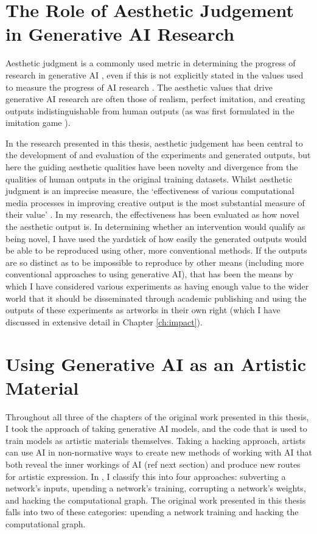 \section{The Role of Aesthetic Judgement in Generative AI Research}
\label{c8:sec:aesthetic}

Aesthetic judgment is a commonly used metric in determining the progress of research in generative AI \citep{larsen2016autoencoding}, even if this is not explicitly stated in the values used to measure the progress of AI research \citep{birhane2022values}.
The aesthetic values that drive generative AI research are often those of realism, perfect imitation, and creating outputs indistinguishable from human outputs (as was first formulated in the imitation game \citep{machinery1950computing}). 

In the research presented in this thesis, aesthetic judgement has been central to the development of and evaluation of the experiments and generated outputs, but here the guiding aesthetic qualities have been novelty and divergence from the qualities of human outputs in the original training datasets.
Whilst aesthetic judgment is an imprecise measure, the `effectiveness of various computational media processes in improving creative output is the most substantial measure of their value' \citep{brown2009integrating}. 
In my research, the effectiveness has been evaluated as how novel the aesthetic output is. 
In determining whether an intervention would qualify as being novel, I have used the yardstick of how easily the generated outputs would be able to be reproduced using other, more conventional methods.
If the outputs are so distinct as to be impossible to reproduce by other means (including more conventional approaches to using generative AI), that has been the means by which I have considered various experiments as having enough value to the wider world that it should be disseminated through academic publishing and using the outputs of these experiments as artworks in their own right (which I have discussed in extensive detail in Chapter \ref{ch:impact}).

\section{Using Generative AI as an Artistic Material}
\label{c8:sec:material}
Throughout all three of the chapters of the original work presented in this thesis, I took the approach of taking generative AI models, and the code that is used to train models as artistic materials themselves.
Taking a hacking approach, artists can use AI in non-normative ways to create new methods of working with AI that both reveal the inner workings of AI (ref next section) and produce new routes for artistic expression. 
In \cite{broad2024using}, I classify this into four approaches: subverting a network's inputs, upending a network's training, corrupting a network's weights, and hacking the computational graph. 
The original work presented in this thesis falls into two of these categories: upending a network training and hacking the computational graph.

